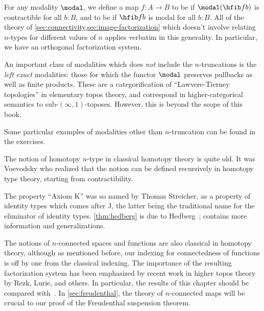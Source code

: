 For any modality $\modal$, we define a map $f:A\to B$ to be 
%
%
if $\modal(\hfib f b)$ is contractible for all $b:B$, and to be 
%
%
if $\hfib f b$ is modal for all $b:B$.
All of the theory of \cref{sec:connectivity,sec:image-factorization} which doesn't involve relating $n$-types for different values of $n$ applies verbatim in this generality.
%
%
In particular, we have an orthogonal factorization system.

An important class of modalities which does \emph{not} include the $n$-trun\-ca\-tions is the \emph{left exact} modalities: those for which the functor $\modal$ preserves pullbacks as well as finite products.
%
These are a categorification of ``Lawvere-Tierney topologies'' in elementary topos theory,
and correspond in higher-categorical semantics to sub-$(\infty,1)$-toposes.
%
However, this is beyond the scope of this book.

Some particular examples of modalities other than $n$-truncation can be found in the exercises.


\sectionNotes

The notion of homotopy $n$-type in classical homotopy theory is quite old.
It was Voevodsky who realized that the notion can be defined recursively in homotopy type theory, starting from contractibility.

%
The property ``Axiom K'' was so named by Thomas Streicher, as a property of identity types which comes after J, the latter being the traditional name for the eliminator of identity types.
\cref{thm:hedberg} is due to Hedberg~\cite{hedberg1998coherence}; \cite{krausgeneralizations} contains more information and generalizations.

The notions of $n$-connected spaces and functions are also classical in homotopy theory, although as mentioned before, our indexing for connectedness of functions is off by one from the classical indexing.
The importance of the resulting factorization system has been emphasized by recent work in higher topos theory by Rezk, Lurie, and others.%
In particular, the results of this chapter should be compared with~\cite[\S6.5.1]{lurie:higher-topoi}.
In \cref{sec:freudenthal}, the theory of $n$-connected maps will be crucial to our proof of the Freudenthal suspension theorem.

